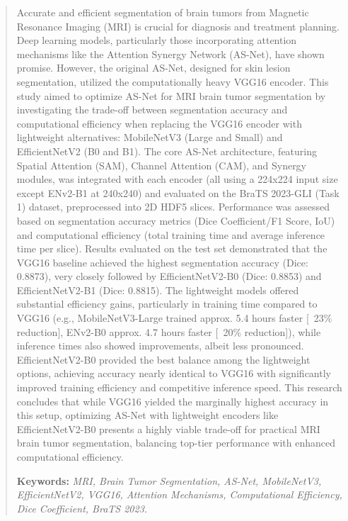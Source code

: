 \begin{abstract}
  \begin{singlespacing}
    Accurate and efficient segmentation of brain tumors from Magnetic Resonance Imaging (MRI) is crucial for diagnosis and treatment planning. Deep learning models, particularly those incorporating attention mechanisms like the Attention Synergy Network (AS-Net), have shown promise. However, the original AS-Net, designed for skin lesion segmentation, utilized the computationally heavy VGG16 encoder. This study aimed to optimize AS-Net for MRI brain tumor segmentation by investigating the trade-off between segmentation accuracy and computational efficiency when replacing the VGG16 encoder with lightweight alternatives: MobileNetV3 (Large and Small) and EfficientNetV2 (B0 and B1). The core AS-Net architecture, featuring Spatial Attention (SAM), Channel Attention (CAM), and Synergy modules, was integrated with each encoder (all using a 224x224 input size except ENv2-B1 at 240x240) and evaluated on the BraTS 2023-GLI (Task 1) dataset, preprocessed into 2D HDF5 slices. Performance was assessed based on segmentation accuracy metrics (Dice Coefficient/F1 Score, IoU) and computational efficiency (total training time and average inference time per slice). Results evaluated on the test set demonstrated that the VGG16 baseline achieved the highest segmentation accuracy (Dice: 0.8873), very closely followed by EfficientNetV2-B0 (Dice: 0.8853) and EfficientNetV2-B1 (Dice: 0.8815). The lightweight models offered substantial efficiency gains, particularly in training time compared to VGG16 (e.g., MobileNetV3-Large trained approx. 5.4 hours faster [~23\% reduction], ENv2-B0 approx. 4.7 hours faster [~20\% reduction]), while inference times also showed improvements, albeit less pronounced. EfficientNetV2-B0 provided the best balance among the lightweight options, achieving accuracy nearly identical to VGG16 with significantly improved training efficiency and competitive inference speed. This research concludes that while VGG16 yielded the marginally highest accuracy in this setup, optimizing AS-Net with lightweight encoders like EfficientNetV2-B0 presents a highly viable trade-off for practical MRI brain tumor segmentation, balancing top-tier performance with enhanced computational efficiency.

    \vspace{\baselineskip}

    \noindent
    \textbf{Keywords:} \textit{MRI, Brain Tumor Segmentation, AS-Net, MobileNetV3, EfficientNetV2, VGG16, Attention Mechanisms, Computational Efficiency, Dice Coefficient, BraTS 2023.}

  \end{singlespacing}
\end{abstract}